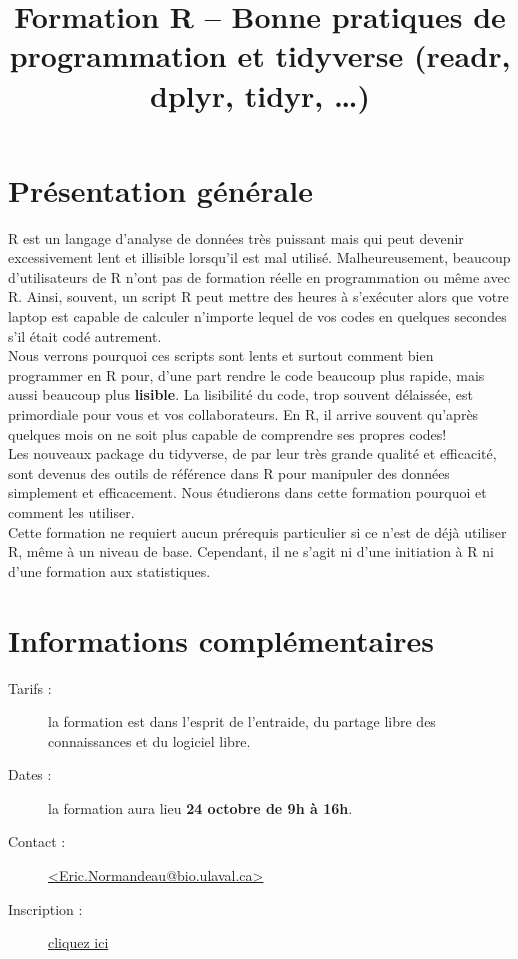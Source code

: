 \documentclass[a4paper,12pt]{article}
\title{\vspace{-2.5cm} Formation R -- Bonne pratiques de programmation et tidyverse (readr, dplyr, tidyr, \ldots) \vspace{-1cm}}
\date{}
\newcommand\BackImage[2][scale=1]{%
\BgThispage
\backgroundsetup{
  contents={\texttt{[image: \#2]}}
  }
}
\begin{document}
\BackImage[width=1\paperwidth]{bkg}
\sloppy	

\maketitle
  
\section*{Présentation générale}
  
R est un langage d'analyse de données très puissant mais qui peut devenir excessivement lent et illisible lorsqu'il est mal utilisé. Malheureusement, beaucoup d'utilisateurs de R n'ont pas de formation réelle en programmation ou même avec R. Ainsi, souvent, un script R peut mettre des heures à s’exécuter alors que votre laptop est capable de calculer n'importe lequel de vos codes en quelques secondes s'il était codé autrement.\\

Nous verrons pourquoi ces scripts sont lents et surtout comment bien programmer en R pour, d'une part rendre le code beaucoup plus rapide, mais aussi beaucoup plus \textbf{lisible}. La lisibilité du code, trop souvent délaissée, est primordiale pour vous et vos collaborateurs. En R, il arrive souvent qu'après quelques mois on ne soit plus capable de comprendre ses propres codes!\\

Les nouveaux package du tidyverse, de par leur très grande qualité et efficacité, sont devenus des outils de référence dans R pour manipuler des données simplement et efficacement. Nous étudierons dans cette formation pourquoi et comment les utiliser.\\

Cette formation ne requiert aucun prérequis particulier si ce n'est de déjà utiliser R, même à un niveau de base. Cependant, il ne s'agit ni d'une initiation à R ni d'une formation aux statistiques.

\section*{Informations complémentaires}


\begin{description}
\item[Tarifs :] la formation est \textbf{} dans l'esprit de l'entraide, du partage libre des connaissances et du logiciel libre.
\item[Dates :] la formation aura lieu \textbf{24 octobre de 9h à 16h}.
\item[Contact :] \href{mailto:Eric.Normandeau@bio.ulaval.ca}{<Eric.Normandeau@bio.ulaval.ca>}
\item[Inscription :] \href{https://goo.gl/forms/lSbyBM5SpiT1PKU63}{cliquez ici}
\end{description}
\end{document}
